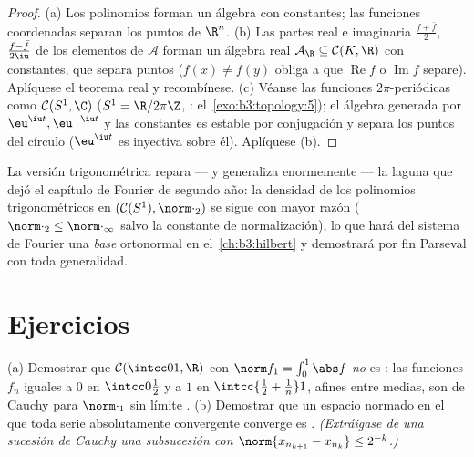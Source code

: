 \begin{proof}
(a) Los polinomios forman un álgebra con constantes; las funciones
coordenadas separan los puntos de $\R^n$. (b) Las partes real e
imaginaria $\frac{f + \bar f}2$, $\frac{f - \bar f}{2\iu}$ de los
elementos de $\mathcal A$ forman un álgebra real
$\mathcal A_\R \subseteq \mathcal C(K, \R)$ con constantes, que separa
puntos ($f(x) \ne f(y)$ obliga a que $\operatorname{Re}f$ o
$\operatorname{Im}f$ separe). Aplíquese el teorema real y recombínese.
(c) Véanse las funciones $2\pi$-periódicas como $\mathcal C(S^1, \C)$
($S^1 = \R/2\pi\Z$, :
el~\cref{exo:b3:topology:5}); el álgebra generada por
$\eu^{\iu t}, \eu^{-\iu t}$ y las constantes es estable por conjugación
y separa los puntos del círculo ($\eu^{\iu t}$ es inyectiva sobre él).
Aplíquese (b).
\end{proof}

\begin{remark}\label{rem:b3:complete:swremark}
La versión trigonométrica repara --- y generaliza enormemente --- la
laguna que dejó el capítulo de Fourier de segundo año: la densidad de
los polinomios trigonométricos en $(\mathcal C(S^1), \norm\cdot_2)$ se
sigue con mayor razón ($\norm\cdot_2 \leq \norm\cdot_\infty$ salvo la
constante de normalización), lo que hará del sistema de Fourier una
\emph{base} ortonormal en el~\cref{ch:b3:hilbert} y demostrará por fin
Parseval con toda generalidad.
\end{remark}

\section{Ejercicios}

\begin{exercise}[$\star$]\label{exo:b3:complete:1}
(a) Demostrar que $\mathcal C(\intcc01, \R)$ con
$\norm f_1 = \int_0^1\abs f$ \emph{no} es
: las funciones $f_n$ iguales
a $0$ en $\intcc0{\frac12}$ y a $1$ en $\intcc{\frac12 + \frac1n}1$,
afines entre medias, son de Cauchy para $\norm\cdot_1$ sin límite
. (b) Demostrar que un
espacio normado en el que toda serie absolutamente convergente converge
es . \emph{(Extráigase de una
sucesión de Cauchy una subsucesión con $\norm{x_{n_{k+1}} -
x_{n_k}} \leq 2^{-k}$.)}
\end{exercise}

